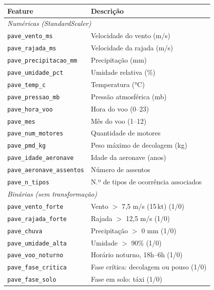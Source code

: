\documentclass[english,brazilian]{UNISINOSartigo}
\begin{document}
\begin{quadro}[ht]
  \caption{Features numéricas e binárias do modelo preditivo}
  \label{quad:features}
  \centering
  \begin{tabular}{lp{7cm}}
    \toprule
    \textbf{Feature} & \textbf{Descrição} \\
    \midrule
    \multicolumn{2}{l}{\textit{Numéricas (StandardScaler)}} \\
    \texttt{pave\_vento\_ms}       & Velocidade do vento (m/s) \\
    \texttt{pave\_rajada\_ms}      & Velocidade da rajada (m/s) \\
    \texttt{pave\_precipitacao\_mm}& Precipitação (mm) \\
    \texttt{pave\_umidade\_pct}    & Umidade relativa (\%) \\
    \texttt{pave\_temp\_c}         & Temperatura (°C) \\
    \texttt{pave\_pressao\_mb}     & Pressão atmosférica (mb) \\
    \texttt{pave\_hora\_voo}       & Hora do voo (0--23) \\
    \texttt{pave\_mes}             & Mês do voo (1--12) \\
    \texttt{pave\_num\_motores}    & Quantidade de motores \\
    \texttt{pave\_pmd\_kg}         & Peso máximo de decolagem (kg) \\
    \texttt{pave\_idade\_aeronave} & Idade da aeronave (anos) \\
    \texttt{pave\_aeronave\_assentos} & Número de assentos \\
    \texttt{pave\_n\_tipos}        & N.º de tipos de ocorrência associados \\
    \midrule
    \multicolumn{2}{l}{\textit{Binárias (sem transformação)}} \\
    \texttt{pave\_vento\_forte}    & Vento $>$ 7,5 m/s (15\,kt) (1/0) \\
    \texttt{pave\_rajada\_forte}   & Rajada $>$ 12,5 m/s (1/0) \\
    \texttt{pave\_chuva}           & Precipitação $>$ 0 mm (1/0) \\
    \texttt{pave\_umidade\_alta}   & Umidade $>$ 90\% (1/0) \\
    \texttt{pave\_voo\_noturno}    & Horário noturno, 18h--6h (1/0) \\
    \texttt{pave\_fase\_critica}   & Fase crítica: decolagem ou pouso (1/0) \\
    \texttt{pave\_fase\_solo}      & Fase em solo: táxi (1/0) \\

\end{tabular}
\end{quadro}
\end{document}
